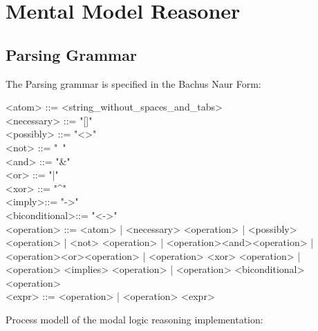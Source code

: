 \documentclass{scrartcl}
\begin{document}
\section*{Mental Model Reasoner}

\subsection*{Parsing Grammar}

The Parsing grammar is specified in the Bachus Naur Form:
\begin{grammar}
    <atom> ::= <string_without_spaces_and_tabs>\\
    <necessary> ::= "[]"\\
    <possibly> ::= "<>"\\
    <not> ::= "~"\\
    <and> ::= "&"\\
    <or> ::= "|"\\
    <xor> ::= "^"\\
    <imply>::= "->"\\
    <biconditional>::= "<->"\\
    <operation> ::=  <atom> | <necessary> <operation> | <possibly>
    <operation> | <not> <operation> |
		   <operation><and><operation> | <operation><or><operation>
                   |
		   <operation> <xor> <operation> | <operation> <implies>
                   <operation> | <operation> <biconditional> <operation>\\
    <expr> ::= <operation> | <operation> <expr>
\end{grammar}

 Process modell of the modal logic reasoning implementation:
\end{document}
